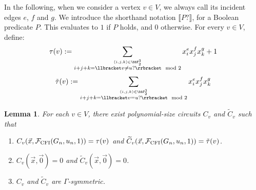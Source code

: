\documentclass[10pt,a4paper]{article}
\newtheorem{lemma}[theorem]{Lemma}
\newcommand{\Ff}{{\cal F}}
\newcommand{\CFI}{\Ff_{\mathrm{CFI}}}
\newcommand{\tautilde}{\tilde{\tau}}
\begin{document}
In the following, when we consider a vertex $v \in V$, we always call its incident edges $e$, $f$ and $g$. We introduce the shorthand notation $\llbracket P? \rrbracket$, for a Boolean predicate $P$. This evaluates to $1$ if $P$ holds, and $0$ otherwise.
For every $v \in V$, define:
\[
\tau(v) := \sum_{\stackrel{(i,j,k) \in \bbF_2^3}{i+j+k = \llbracket v \neq u? \rrbracket \mod 2}} x_i^{e} x^{f}_j x^{g}_k + 1
\]
\[
\tautilde(v) := \sum_{\stackrel{(i,j,k) \in \bbF_2^3}{i+j+k = \llbracket v = u? \rrbracket \mod 2}} x_i^{e} x^{f}_j x^{g}_k
\]
\begin{lemma}
	\label{lem:tauPolynomialsComputable}
	For each $v \in V$, there exist polynomial-size circuits $C_v$ and $\widetilde{C}_v$ such that 
	\begin{enumerate}
		\item $C_v(\vec x, \CFI(G_n, u_n, 1)) = \tau(v)$ and $\widetilde{C}_v(\vec x, \CFI(G_n, u_n, 1)) = \tautilde(v)$. 
		\item $C_v(\vec x, \vec 0) = 0$ and $\widetilde{C}_v(\vec x, \vec 0) = 0$.
		\item $C_v$ and $\widetilde{C}_v$ are $\Gamma$-symmetric.
	\end{enumerate}	
\end{lemma}	
\end{document}
